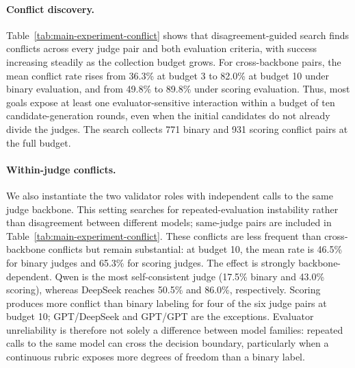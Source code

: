 

\paragraph{Conflict discovery.}
Table~\ref{tab:main-experiment-conflict} shows that disagreement-guided search
finds conflicts across every judge pair and both evaluation criteria, with
success increasing steadily as the collection budget grows. For
cross-backbone pairs, the mean conflict rate rises from 36.3\% at budget 3 to
82.0\% at budget 10 under binary evaluation, and from 49.8\% to 89.8\% under
scoring evaluation. Thus, most goals expose at least one evaluator-sensitive
interaction within a budget of ten candidate-generation rounds, even when the
initial candidates do not already divide the judges. The search collects 771
binary and 931 scoring conflict pairs at the full budget.

\paragraph{Within-judge conflicts.}
We also instantiate the two validator roles with independent calls to the same
judge backbone. This setting searches for repeated-evaluation instability rather
than disagreement between different models; same-judge pairs are included in
Table~\ref{tab:main-experiment-conflict}. These conflicts are less frequent
than cross-backbone conflicts but remain substantial: at budget 10, the mean
rate is 46.5\% for binary judges and 65.3\% for scoring judges. The effect is
strongly backbone-dependent. Qwen is the most self-consistent judge (17.5\%
binary and 43.0\% scoring), whereas DeepSeek reaches 50.5\% and 86.0\%,
respectively. Scoring produces more conflict than binary labeling for four of
the six judge pairs at budget 10; GPT/DeepSeek and GPT/GPT are the exceptions.
Evaluator unreliability is therefore not solely a difference between model families:
repeated calls to the same model can cross the decision boundary, particularly
when a continuous rubric exposes more degrees of freedom than a binary label.
